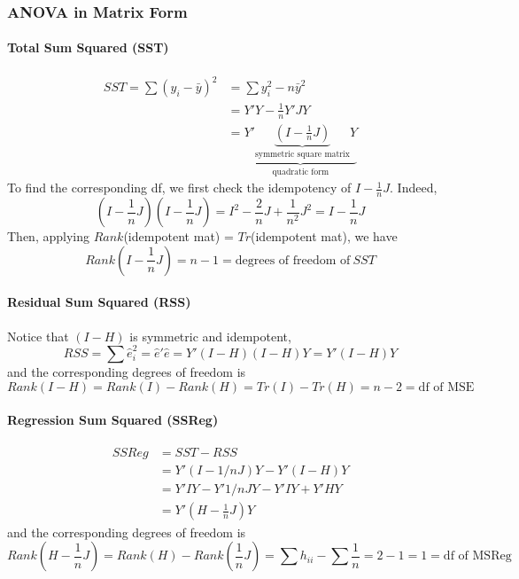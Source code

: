 \documentclass[10pt]{article}
\begin{document}
\subsubsection{ANOVA in Matrix Form}
\paragraph{Total Sum Squared (SST)}
\begin{align*}
    SST = \sum\left(y_{i}-\bar{y}\right)^{2} &=\sum y_{i}^{2}-n \bar{y}^{2} \\
    &= Y'Y - \frac{1}{n}Y'J Y \\
    &= \underbrace{Y'\underbrace{(I - \frac{1}{n}J)}_{\text{symmetric square matrix}} Y}_{\text{quadratic form}}
\end{align*}
To find the corresponding df, we first check the idempotency of $I - \frac{1}{n}J$. Indeed,
\begin{equation*}
    (I - \frac{1}{n}J)(I - \frac{1}{n}J) = I^2 - \frac{2}{n}J + \frac{1}{n^2}J^2 = I - \frac{1}{n}J
\end{equation*}
Then, applying $Rank$(idempotent mat) = $Tr$(idempotent mat), we have
\begin{equation*}
    Rank(I - \frac{1}{n}J) = n - 1 = \text{degrees of freedom of} ~SST
\end{equation*}

\paragraph{Residual Sum Squared (RSS)}
Notice that $(I - H)$ is symmetric and idempotent,
\begin{equation*}
    R S S=\sum \hat{e}_{i}^{2} = \hat{e}' \hat{e} = Y'(I - H)(I - H)Y = Y'(I - H)Y
\end{equation*}
and the corresponding degrees of freedom is
\begin{equation*}
    Rank(I - H) = Rank(I) - Rank(H) = Tr(I) - Tr(H) = n-2 = \text{df of MSE}
\end{equation*}

\paragraph{Regression Sum Squared (SSReg)}
\begin{align*}
    SSReg &= SST - RSS \\
    &= Y'(I - 1/n J)Y - Y'(I - H)Y \\
    &= Y'IY - Y' 1/n JY - Y'IY + Y'HY \\
    &= Y'(H - \frac{1}{n}J) Y
\end{align*}
and the corresponding degrees of freedom is
\begin{equation*}
    Rank(H - \frac{1}{n}J) = Rank(H) - Rank(\frac{1}{n}J) = \sum h_{ii} - \sum \frac{1}{n} = 2 - 1 = 1 = \text{df of MSReg}
\end{equation*}
\end{document}
